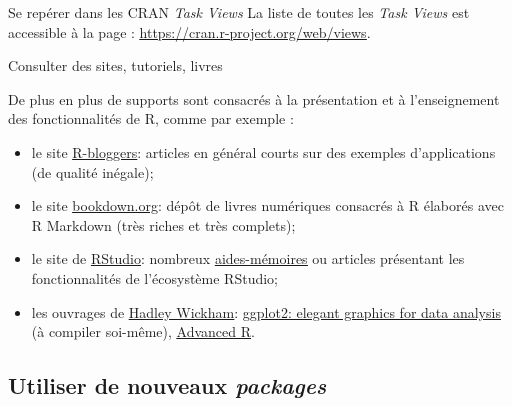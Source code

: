 \documentclass[12pt,handout,ignorenonframetext,]{beamer}
\begin{document}
\begin{frame}{Se repérer dans les CRAN \protect\textit{Task Views}}
\pause \bigskip \normalsize
La liste de toutes les \emph{Task Views} est accessible à la page :
\href{https://cran.r-project.org/web/views}{\underline{https://cran.r-project.org/web/views}}.

\end{frame}

\begin{frame}{Consulter des sites, tutoriels, livres}

De plus en plus de supports sont consacrés à la présentation et à
l'enseignement des fonctionnalités de R, comme par exemple :

\begin{itemize}
\item
  \pause le site
  \href{https://www.r-bloggers.com}{\underline{R-bloggers}}: articles en
  général courts sur des exemples d'applications (de qualité inégale);
\item
  \pause le site \href{https://bookdown.org}{\underline{bookdown.org}}:
  dépôt de livres numériques consacrés à R élaborés avec R Markdown
  (très riches et très complets);
\item
  \pause le site de \href{https://www.rstudio.com}{\underline{RStudio}}:
  nombreux
  \href{https://www.rstudio.com/resources/cheatsheets/}{\underline{aides-mémoires}}
  ou articles présentant les fonctionnalités de l'écosystème RStudio;
\item
  \pause les ouvrages de
  \href{http://hadley.nz}{\underline{Hadley Wickham}}:
  \href{https://github.com/hadley/ggplot2-book}{\underline{ggplot2: elegant graphics for data analysis}}
  (à compiler soi-même),
  \href{http:/:adv-r.had.co.nz}{\underline{Advanced R}}.
\end{itemize}

\end{frame}

\subsection{\texorpdfstring{Utiliser de nouveaux
\protect\textit{packages}}{Utiliser de nouveaux }}\label{utiliser-de-nouveaux}
\end{document}
